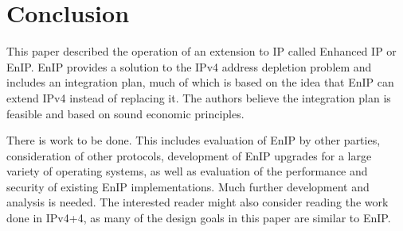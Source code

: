 \section{Conclusion}
This paper described the operation of an extension to IP called Enhanced IP or EnIP.
EnIP provides a solution to the IPv4 address depletion problem and
includes an integration plan, much of which is based on the idea that
EnIP can extend IPv4 instead of replacing it.  The authors believe the integration plan
is feasible and based on sound economic principles.

There is work to be done.  This includes evaluation of EnIP by other parties, 
consideration of other protocols, 
development of EnIP upgrades for a large variety of operating systems, as well as evaluation of the
performance and security of existing EnIP implementations.  Much further development and analysis
is needed.  The interested reader might also consider reading the work done in IPv4+4\cite{Stand04,Stand05},
as many of the design goals in this paper are similar to EnIP.
